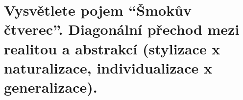 \section{Vysvětlete pojem \enquote{Šmokův čtverec}. Diagonální přechod mezi realitou a abstrakcí 
(stylizace x naturalizace, individualizace x generalizace).}